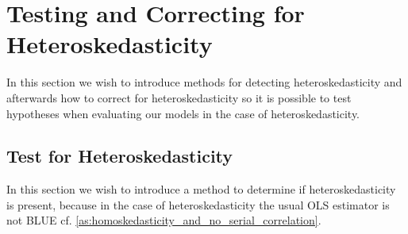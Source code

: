     


\section{Testing and Correcting for Heteroskedasticity}
In this section we wish to introduce methods for detecting heteroskedasticity and afterwards how to correct for heteroskedasticity so it is possible to test hypotheses when evaluating our models in the case of heteroskedasticity.

\subsection{Test for Heteroskedasticity}
In this section we wish to introduce a method to determine if heteroskedasticity is present, because in the case of heteroskedasticity the usual OLS estimator is not BLUE cf. \ref{as:homoskedasticity_and_no_serial_correlation}. 

